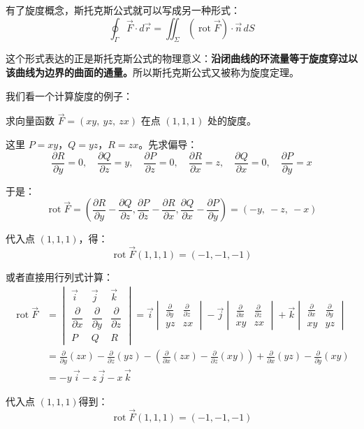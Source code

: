 有了旋度概念，斯托克斯公式就可以写成另一种形式：
\[
\oint_{\Gamma}\vec{F}\cdot d\vec{r}
=
\iint_{\Sigma}(\operatorname{rot}\vec{F})\cdot\vec{n}\,dS
\]

这个形式表达的正是斯托克斯公式的物理意义：\textbf{沿闭曲线的环流量等于旋度穿过以该曲线为边界的曲面的通量。}所以斯托克斯公式又被称为旋度定理。

我们看一个计算旋度的例子：

\begin{myexample}
求向量函数 $\vec{F}=(xy,\ yz,\ zx)$ 在点 $(1,1,1)$ 处的旋度。

这里 $P=xy$，$Q=yz$，$R=zx$。先求偏导：
\[
\frac{\partial R}{\partial y}=0,\quad \frac{\partial Q}{\partial z}=y,\quad
\frac{\partial P}{\partial z}=0,\quad \frac{\partial R}{\partial x}=z,\quad
\frac{\partial Q}{\partial x}=0,\quad \frac{\partial P}{\partial y}=x
\]

于是：
\[
\operatorname{rot}\vec{F}
=
\left(\frac{\partial R}{\partial y}-\frac{\partial Q}{\partial z},
\frac{\partial P}{\partial z}-\frac{\partial R}{\partial x},
\frac{\partial Q}{\partial x}-\frac{\partial P}{\partial y}\right)
=
(-y,\ -z,\ -x)
\]

代入点 $(1,1,1)$，得：
\[
\operatorname{rot}\vec{F}(1,1,1)=(-1,-1,-1)
\]

或者直接用行列式计算：
\[
\begin{aligned}
    \operatorname{rot}\vec{F}
    &=
    \begin{vmatrix}
    \vec{i} & \vec{j} & \vec{k} \\
    \dfrac{\partial}{\partial x} & \dfrac{\partial}{\partial y} & \dfrac{\partial}{\partial z} \\
    P & Q & R
    \end{vmatrix}
    =
    \vec{i}
    \begin{vmatrix}
    \frac{\partial}{\partial y} & \frac{\partial}{\partial z} \\
    yz & zx
    \end{vmatrix}
    -
    \vec{j}
    \begin{vmatrix}
    \frac{\partial}{\partial x} & \frac{\partial}{\partial z} \\
    xy & zx
    \end{vmatrix}
    +
    \vec{k}
    \begin{vmatrix}
    \frac{\partial}{\partial x} & \frac{\partial}{\partial y} \\
    xy & yz
    \end{vmatrix}\\
    &=
    \frac{\partial}{\partial y}(zx)
-
\frac{\partial}{\partial z}(yz)-(\frac{\partial}{\partial x}(zx)
-
\frac{\partial}{\partial z}(xy))+\frac{\partial}{\partial x}(yz)
-
\frac{\partial}{\partial y}(xy)\\
&=
-y\,\vec{i}
-z\,\vec{j}
-x\,\vec{k}
\end{aligned}
\]

代入点 \((1,1,1)\)得到：
\[
\operatorname{rot}\vec{F}(1,1,1)
=
(-1, -1, -1)
\]
\end{myexample}

